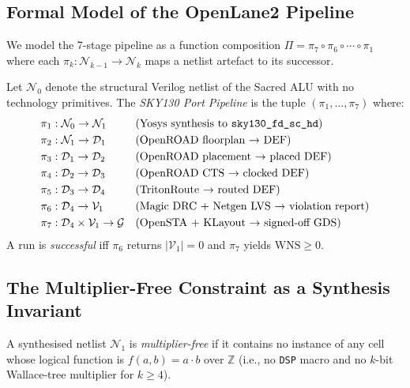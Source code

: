 \subsection{Formal Model of the OpenLane2 Pipeline}
\label{subsec:72:formal-model}

We model the 7-stage pipeline as a function composition
$\Pi = \pi_7 \circ \pi_6 \circ \cdots \circ \pi_1$
where each $\pi_k : \mathcal{N}_{k-1} \to \mathcal{N}_k$ maps a netlist
artefact to its successor.

\begin{definition}
\label{def:72:pipeline}
Let $\mathcal{N}_0$ denote the structural Verilog netlist of the Sacred ALU
with no technology primitives.
The \emph{SKY130 Port Pipeline} is the tuple
$(\pi_1, \ldots, \pi_7)$ where:
\begin{align*}
\pi_1 &: \mathcal{N}_0 \to \mathcal{N}_1
  &&\text{(Yosys synthesis to \texttt{sky130\_fd\_sc\_hd})} \\
\pi_2 &: \mathcal{N}_1 \to \mathcal{D}_1
  &&\text{(OpenROAD floorplan → DEF)} \\
\pi_3 &: \mathcal{D}_1 \to \mathcal{D}_2
  &&\text{(OpenROAD placement → placed DEF)} \\
\pi_4 &: \mathcal{D}_2 \to \mathcal{D}_3
  &&\text{(OpenROAD CTS → clocked DEF)} \\
\pi_5 &: \mathcal{D}_3 \to \mathcal{D}_4
  &&\text{(TritonRoute → routed DEF)} \\
\pi_6 &: \mathcal{D}_4 \to \mathcal{V}_1
  &&\text{(Magic DRC + Netgen LVS → violation report)} \\
\pi_7 &: \mathcal{D}_4 \times \mathcal{V}_1 \to \mathcal{G}
  &&\text{(OpenSTA + KLayout → signed-off GDS)} \\
\end{align*}
A run is \emph{successful} iff $\pi_6$ returns $|\mathcal{V}_1| = 0$ and
$\pi_7$ yields $\mathrm{WNS} \ge 0$.
\end{definition}

\subsection{The Multiplier-Free Constraint as a Synthesis Invariant}
\label{subsec:72:mult-free-synth}

\begin{definition}
\label{def:72:mult-free}
A synthesised netlist $\mathcal{N}_1$ is \emph{multiplier-free} if
it contains no instance of any cell whose logical function
is $f(a,b) = a \cdot b$ over $\mathbb{Z}$ (i.e., no \texttt{DSP} macro
and no $k$-bit Wallace-tree multiplier for $k \ge 4$).
\end{definition}

